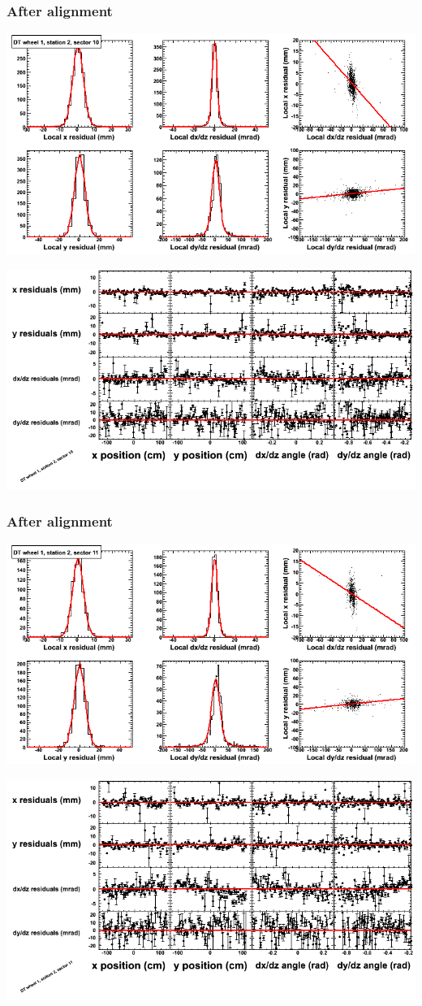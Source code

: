 \documentclass[compress]{beamer}
\begin{document}
\begin{frame}
\frametitle{After alignment}
\includegraphics[width=0.7\linewidth]{NOV4_fitfunctions/MBwhDst2sec10_bellcurves.png}

\includegraphics[width=0.7\linewidth]{NOV4_fitfunctions/MBwhDst2sec10_polynomials.png}
\end{frame}

\begin{frame}
\frametitle{After alignment}
\includegraphics[width=0.7\linewidth]{NOV4_fitfunctions/MBwhDst2sec11_bellcurves.png}

\includegraphics[width=0.7\linewidth]{NOV4_fitfunctions/MBwhDst2sec11_polynomials.png}
\end{frame}
\end{document}
